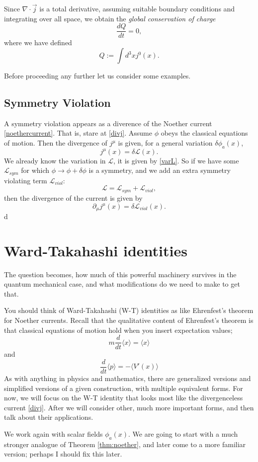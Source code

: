 \documentclass[main.tex]{subfiles}
\begin{document}
Since $\nabla \cdot \vec{j}$ is a total derivative, assuming suitable boundary conditions and integrating over all space, we obtain the \textit{global conservation of charge}
\[
\frac{d Q }{dt} = 0,
\]
where we have defined
\[
Q := \int d^3 x j^0 (x).
\]

Before proceeding any further let us consider some examples.

\subsection{Symmetry Violation}
A symmetry violation appears as a diverence of the Noether current \ref{noethercurrent}. That is, stare at \ref{divj}. Assume $\phi$ obeys the classical equations of motion. Then the divergence of $j^\mu$ is given, for a general variation $\delta \phi_a (x)$,
\begin{equation} \label{varj}
j^\mu (x) = \delta \mathcal{L} (x).
\end{equation}
We already know the variation in $\mathcal{L}$, it is given by \ref{varL}. So if we have some $\mathcal{L}_{sym}$ for which $\phi \to \phi + \delta \phi$ is a symmetry, and we add an extra symmetry violating term $\mathcal{L}_{viol}$:
\[
\mathcal{L} = \mathcal{L}_{sym} + \mathcal{L}_{viol},
\]
then the divergence of the current is given by 
\[
\partial_\mu j^\mu (x) = \delta \mathcal{L}_{viol} (x).
\]
d
\section{Ward-Takahashi identities}
The question becomes, how much of this powerful machinery survives in the quantum mechanical case, and what modifications do we need to make to get that.

You should think of Ward-Takahashi (W-T) identities as like Ehrenfest's theorem for Noether currents. Recall that the qualitative content of Ehrenfest's theorem is that classical equations of motion hold when you insert expectation values;
\[
m\frac{d}{dt} \langle x \rangle = \langle x \rangle
\]
and
\[
\frac{d}{dt} \langle p \rangle = - \langle V'(x) \rangle
\]
As with anything in physics and mathematics, there are generalized versions and simplified versions of a given construction, with multiple equivalent forms. For now, we will focus on the W-T identity that looks most like the divergenceless current \ref{divj}. After we will consider other, much more important forms, and then talk about their applications. 

We work again with scalar fields $\phi_a (x)$. We are going to start with a much stronger analogue of Theorem \ref{thm:noether}, and later come to a more familiar version; perhaps I should fix this later.
\end{document}
